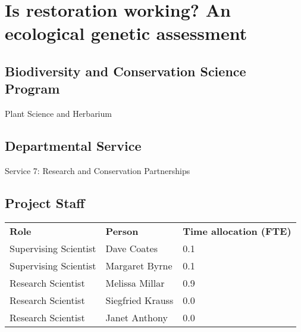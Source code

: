 \documentclass[version=last,
    paper=a4,                               %
    10pt,                                   %
    dvipsnames,
    oneside,                              %
    headings=openany,                       %
    open=any,
    BCOR=7mm,                               %
    DIV=15,     %
]{scrbook}
\begin{document}
\frontmatter
\maketitle
\mainmatter



\section*{Is restoration working? An ecological genetic assessment
}



\subsection*{Biodiversity and Conservation Science Program}

Plant Science and Herbarium




\subsection*{Departmental Service}

Service 7: Research and Conservation Partnerships


\subsection*{Project Staff}
\begin{tabu} {X X X}
\textbf{Role} & \textbf{Person} & \textbf{Time allocation (FTE)}\\

Supervising Scientist & Dave Coates & 0.1\\

Supervising Scientist & Margaret Byrne & 0.1\\

Research Scientist & Melissa Millar & 0.9\\

Research Scientist & Siegfried Krauss & 0.0\\

Research Scientist & Janet Anthony & 0.0\\

\end{tabu}
\end{document}
